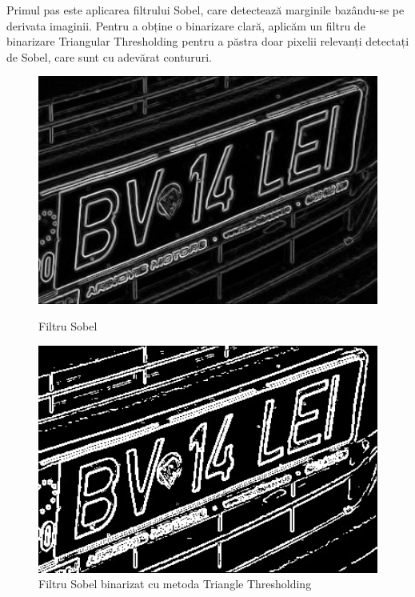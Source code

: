 \documentclass[a4paper,12pt]{report}
\begin{document}
Primul pas este aplicarea filtrului Sobel, care detectează marginile bazându-se pe derivata imaginii. Pentru a obține o binarizare clară, aplicăm un filtru de binarizare Triangular Thresholding pentru a păstra doar pixelii relevanți detectați de Sobel, care sunt cu adevărat contururi.

\begin{figure}[h]
    \centering
    \begin{minipage}{0.4\textwidth}
        \centering
        \includegraphics[width=1\textwidth]{images/sobel.jpg}
        \caption{Filtru Sobel}
    \end{minipage}
    \hspace{0.05\textwidth}
    \begin{minipage}{0.4\textwidth}
        \centering
        \includegraphics[width=1\textwidth]{images/binary_sobel.jpg}
        \caption{Filtru Sobel binarizat cu metoda Triangle Thresholding}
    \end{minipage}
\end{figure}
\FloatBarrier
\end{document}
